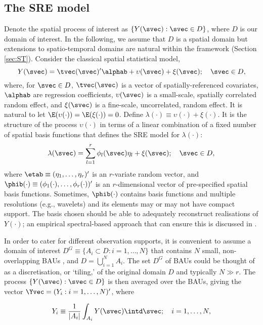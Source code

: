 \subsection{The SRE model} \label{sec:SREModel}

Denote the spatial process of interest as $\{Y(\svec) : \svec \in D\}$, where $D$ is our domain of interest. In the following, we assume that $D$ is a spatial domain but extensions to spatio-temporal domains are natural within the framework (Section \ref{sec:ST}). Consider the classical spatial statistical model,
\begin{equation}
Y(\svec) = \tvec(\svec)'\alphab + \upsilon(\svec) + \xi(\svec); \quad \svec \in D,
\end{equation}
where, for $\svec \in D$, $\tvec(\svec)$ is a vector of spatially-referenced covariates, $\alphab$ are regression coefficients, $\upsilon(\svec)$ is a small-scale, spatially correlated random effect, and $\xi(\svec)$ is a fine-scale, uncorrelated, random effect. It is natural to let $\E(\upsilon(\cdot)) = \E(\xi(\cdot)) = 0$. Define $\lambda(\cdot) \equiv \upsilon(\cdot) + \xi(\cdot)$. It is the structure of the process $\upsilon(\cdot)$ in terms of a linear combination of a fixed number of spatial basis functions that defines the SRE model for $\lambda(\cdot)$:
$$
\lambda(\svec) = \sum_{l=1}^r \phi_l(\svec)\eta_l + \xi(\svec);\quad \svec \in D,
$$
\noindent where $\etab \equiv (\eta_1,\dots,\eta_r)'$ is an $r$-variate random vector, and $\phib(\cdot) \equiv (\phi_1(\cdot),\dots,\phi_r(\cdot))'$ is an $r$-dimensional vector of pre-specified spatial basis functions. Sometimes, $\phib(\cdot)$ contains basis functions and multiple resolutions (e.g., wavelets) and its elements may or may not have compact support. The basis chosen should be able to adequately reconstruct realisations of $Y(\cdot)$; an empirical spectral-based approach that can ensure this is discussed in \cite{Zammit_2012}.

In order to cater for different observation supports, it is convenient to assume a domain of interest $D^G \equiv \{A_i \subset D: i = 1,\dots,N\}$ that contains $N$ small, non-overlapping BAUs \citep{Nguyen_2012}, and $D = \bigcup_{i=1}^N A_i$. The set $D^G$ of BAUs could be thought of as a discretisation, or `tiling,' of the original domain $D$ and typically $N \gg r$. The process $\{Y(\svec): \svec \in D\}$ is then averaged over the BAUs, giving the vector $\Yvec = (Y_i : i = 1,\dots,N)'$, where

\begin{equation}\label{eq:Yi0}
Y_i \equiv \frac{1}{|A_i|}\int_{A_i} Y(\svec) \intd \svec; \quad i = 1,\dots,N,
\end{equation}

